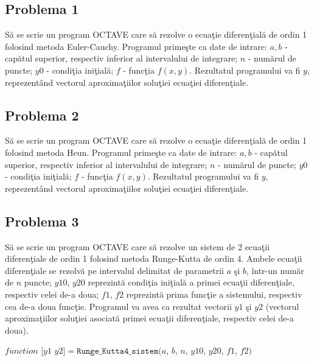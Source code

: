 \documentclass{exam}
\begin{document}
\subsection{Problema 1}

Să se scrie un program OCTAVE care să rezolve o ecuaţie diferenţială de ordin 1 folosind metoda Euler-Cauchy. Programul primeşte ca date de intrare: $a, b$ - capătul superior, respectiv inferior al intervalului de integrare; $n$ - numărul de puncte;  $y0$ - condiţia iniţială; $f$ - funcţia $f(x,y)$. Rezultatul programului va fi $y$, reprezentând vectorul aproximaţiilor soluţiei ecuaţiei diferenţiale.

\subsection{Problema 2}
Să se scrie un program OCTAVE care să rezolve o ecuaţie diferenţială de ordin 1 folosind metoda Heun. Programul primeşte ca date de intrare: $a, b$ - capătul superior, respectiv inferior al intervalului de integrare; $n$ - numărul de puncte;  $y0$ - condiţia iniţială; $f$ - funcţia $f(x,y)$. Rezultatul programului va fi $y$, reprezentând vectorul aproximaţiilor soluţiei ecuaţiei diferenţiale.

\subsection{Problema 3}

Să se scrie un program OCTAVE care să rezolve un sistem de 2 ecuaţii diferenţiale de ordin 1 folosind metoda Runge-Kutta de ordin 4.
Ambele ecuaţii diferenţiale se rezolvă pe intervalul delimitat de parametrii $a$ şi $b$, într-un număr de $n$ puncte; $y10$, $y20$ reprezintă condiţia iniţială a primei ecuaţii diferenţiale, respectiv celei de-a doua; $f1$, $f2$ reprezintă prima funcţie a sistemului, respectiv cea de-a doua funcţie.
Programul va avea ca rezultat vectorii $y1$ şi $y2$ (vectorul aproximaţiilor soluţiei asociată primei ecuaţii diferenţiale, respectiv celei de-a doua).


$function$ $[y1$ $y2] = \texttt{Runge\char`_Kutta4\char`_sistem}(a$, $b$, $n$, $y10$, $y20$, $f1$, $f2)$

\end{document}
